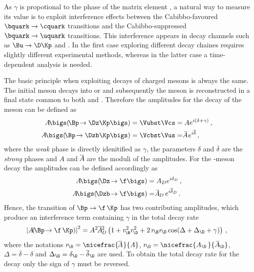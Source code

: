 As $\gamma$ is propotional to the phase of the matrix element \Vub, a natural way to measure its value is to exploit interference effects between the Cabibbo-favoured $\bquark\to\cquark$ transitions and the Cabibbo-suppressed $\bquark\to\uquark$ transitions.
This interference appears in decay channels such as $\Bu\to\D\Kp$ and \BsToDsK.
In the first case exploring different \D decay chaines requires slightly different experimental methods, whereas in the latter case a time-dependent analysis is needed.

The basic principle when exploiting decays of charged \B mesons is always the same.
The initial \Bpm meson decays into \Dz\Kpm or \Dzb\Kpm and subsequently the \mbox{\D meson} is reconstructed in a final state common to both \Dz and \Dzb.
Therefore the amplitudes for the decay of the \B meson can be defined as
\begin{equation}
\begin{aligned}
A\!\bigs(\!\Bp\!\to\Dz\Kp\bigs)&=\Vubst\Vcs=Ae^{i\left(\delta+\gamma\right)}\,,\\
A\!\bigs(\!\Bp\!\to\Dzb\Kp\bigs)&=\Vcbst\Vus=\overline{\kern -2.5pt A\kern -1.0pt}\,e^{i\overline{\delta}}\label{eq:ChargedBDecay}\,,
\end{aligned}
\end{equation}
where the \emph{weak} phase is directly idenitified as $\gamma$, the parameters $\delta$ and $\overline{\delta}$ are the \emph{strong} phases and $A$ and $\overline{\kern -1.0pt A\kern -1.0pt}$ are the moduli of the amplitudes.
For the \D-meson decay the amplitudes can be defined accordingly as
\begin{equation}
\begin{aligned}
A\!\bigs(\!\Dz\!\to\f\bigs)&=A_De^{i\delta_D}\,,\\
A\!\bigs(\!\Dzb\!\to\f\bigs)&=\overline{\kern -2.5pt A\kern -1.0pt}_D\,e^{i\overline{\delta}_D}\,.
\end{aligned}
\end{equation}
Hence, the transition of $\Bp\to\f\,\Kp$ has two contributing amplitudes, which produce an interference term containing $\gamma$ in the total decay rate
\begin{equation}
\left|A\!\!\left(\!\Bp\!\to\f\,\Kp\right)\right|^2=A^2\overline{\kern -1.0pt A\kern -1.0pt}{}_D^2\left(1+r_{\kern -1.0pt \B}^2r_{\kern -1.0pt\D}^2+2\,r_{\kern -1.0pt \B} r_{\kern -1.0pt\D}\cos\!\left(\Delta+\Delta_\D+\gamma\right)\right)\label{eq:totDecRateChargedB}\,,
\end{equation}
where the notations $r_{\kern -1.0pt \B}=\nicefrac{\overline{\kern -1.0pt A\kern -1.0pt}\,}{A}$, $r_{\kern -1.0pt\D}=\nicefrac{A_\D\,}{\kern 2.5pt\overline{\kern -2.5pt A\kern -1.0pt}_\D}$, $\Delta=\overline{\delta}-\delta$ and $\Delta_\D=\delta_\D-\overline{\delta}_\D$ are used.
To obtain the total decay rate for the \Bm decay only the sign of $\gamma$ must be reversed.

